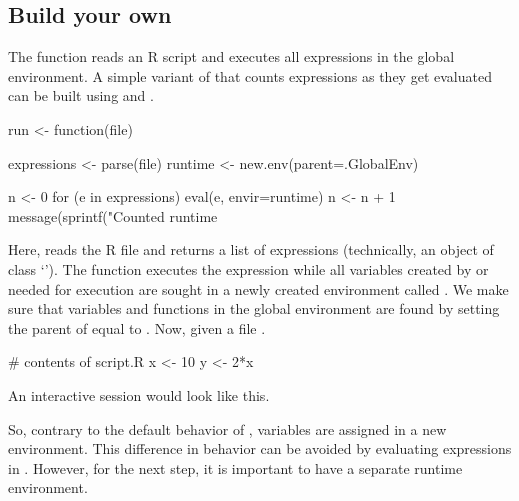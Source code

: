 \subsection{Build your own }
The  function reads an R script and executes all expressions in
the global environment. A simple variant of  that counts
expressions as they get evaluated can be built using  and
.
%
\begin{example}
  run <- function(file){
    expressions <- parse(file)
    runtime <- new.env(parent=.GlobalEnv)

    n <- 0
    for (e in expressions){ 
      eval(e, envir=runtime)
      n <- n + 1
    }
    message(sprintf("Counted %
    runtime
  }
\end{example}
Here,  reads the R file and returns a list of expressions
(technically, an object of class `').  The  function
executes the expression while all variables created by or needed for
execution are sought in a newly created environment called .  We
make sure that variables and functions in the global environment are found by
setting the parent of  equal to .  Now, given a
file .
\begin{example}
  # contents of script.R
  x <- 10
  y <- 2*x
\end{example}
An interactive session would look like this.
So, contrary to the default behavior of , variables are assigned
in a new environment. This difference in behavior can be avoided by evaluating
expressions in . However, for the next step, it is important
to have a separate runtime environment.



